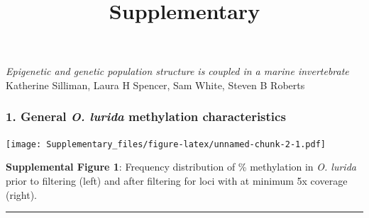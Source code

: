 \documentclass[
]{article}
\title{Supplementary}
\author{}
\date{\vspace{-2.5em}}
\begin{document}
\maketitle

\emph{Epigenetic and genetic population structure is coupled in a marine
invertebrate}\\
Katherine Silliman, Laura H Spencer, Sam White, Steven B Roberts

\hypertarget{general-o.-lurida-methylation-characteristics}{%
\subsubsection{\texorpdfstring{1. General \emph{O. lurida} methylation
characteristics}{1. General O. lurida methylation characteristics}}\label{general-o.-lurida-methylation-characteristics}}

\texttt{[image: Supplementary\_files/figure-latex/unnamed-chunk-2-1.pdf]}

\textbf{Supplemental Figure 1}: Frequency distribution of \% methylation
in \emph{O. lurida} prior to filtering (left) and after filtering for
loci with at minimum 5x coverage (right).

\begin{center}\rule{0.5\linewidth}{0.5pt}\end{center}
\end{document}
